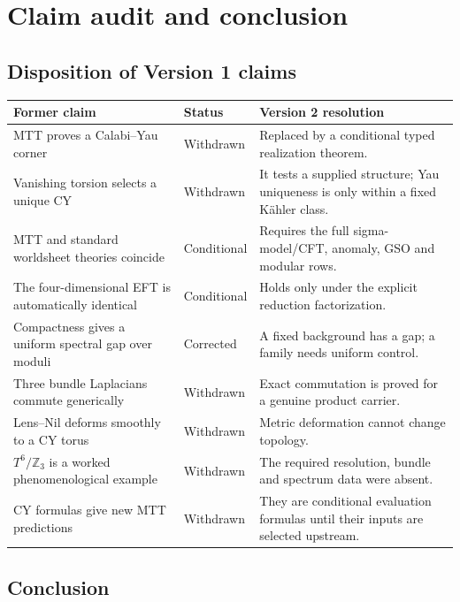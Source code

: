 \documentclass[11pt]{article}
\theoremstyle{definition}
\theoremstyle{remark}
\begin{document}
\section{Claim audit and conclusion}
\label{sec:conclusion}

\subsection{Disposition of Version 1 claims}

\begin{center}
\small
\begin{tabularx}{0.96\textwidth}{@{}p{}p{}X@{}}
\toprule
Former claim & Status & Version 2 resolution \\
\midrule
MTT proves a Calabi--Yau corner & Withdrawn & Replaced by a conditional
typed realization theorem. \\
Vanishing torsion selects a unique CY & Withdrawn & It tests a supplied
structure; Yau uniqueness is only within a fixed K\"ahler class. \\
MTT and standard worldsheet theories coincide & Conditional & Requires the
full sigma-model/CFT, anomaly, GSO and modular rows. \\
The four-dimensional EFT is automatically identical & Conditional & Holds
only under the explicit reduction factorization. \\
Compactness gives a uniform spectral gap over moduli & Corrected & A fixed
background has a gap; a family needs uniform control. \\
Three bundle Laplacians commute generically & Withdrawn & Exact commutation
is proved for a genuine product carrier. \\
Lens--Nil deforms smoothly to a CY torus & Withdrawn & Metric deformation
cannot change topology. \\
\(T^6/\mathbb Z_3\) is a worked phenomenological example & Withdrawn & The
required resolution, bundle and spectrum data were absent. \\
CY formulas give new MTT predictions & Withdrawn & They are conditional
evaluation formulas until their inputs are selected upstream. \\
\bottomrule
\end{tabularx}
\end{center}

\subsection{Conclusion}
\end{document}

